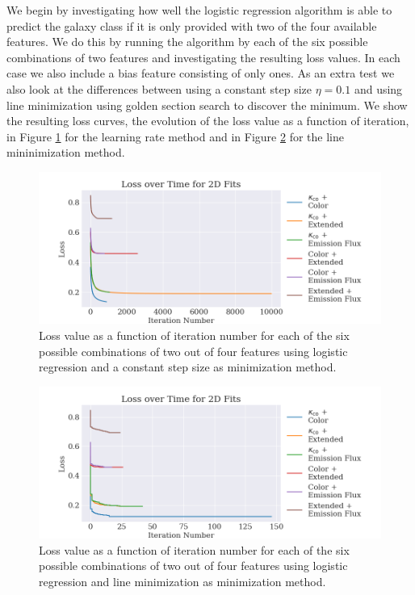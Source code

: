 We begin by investigating how well the logistic regression algorithm is able to predict the galaxy class if it is only provided with two of the four available features. We do this by running the algorithm by each of the six possible combinations of two features and investigating the resulting loss values. In each case we also include a bias feature consisting of only ones. As an extra test we also look at the differences between using a constant step size $\eta = 0.1$ and using line minimization using golden section search to discover the minimum. We show the resulting loss curves, the evolution of the loss value as a function of iteration, in Figure \ref{fig:losscurve_stepsize} for the learning rate method and in Figure \ref{fig:losscurve_linemini} for the line mininimization method. 

\begin{figure}
    \centering
    \includegraphics[width=\textwidth]{results/2d_fit_losses_constant_step.png}
    \caption{Loss value as a function of iteration number for each of the six possible combinations of two out of four features using logistic regression and a constant step size as minimization method.}
    \label{fig:losscurve_stepsize}
\end{figure}

\begin{figure}
    \centering
    \includegraphics[width=\textwidth]{results/2d_fit_losses_line_minim.png}
    \caption{Loss value as a function of iteration number for each of the six possible combinations of two out of four features using logistic regression and line minimization as minimization method.}
    \label{fig:losscurve_linemini}
\end{figure}

